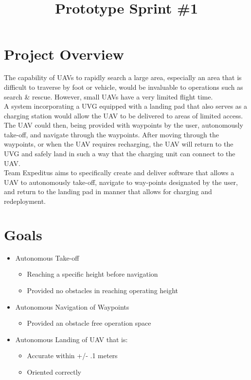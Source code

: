 \documentclass[11pt]{article}
\title{\textbf{Prototype Sprint \#1}}
\date{}
\begin{document}
\maketitle

\section*{Project Overview}

The capability of UAVs to rapidly search a large area, especially an area that is difficult to traverse by foot or vehicle, would be invaluable to operations such as search \& rescue. However, small UAVs have a very limited flight time.\\

\noindent A system incorporating a UVG equipped with a landing pad that also serves as a charging station would allow the UAV to be delivered to areas of limited access. The UAV could then, being provided with waypoints by the user, autonomously take-off, and navigate through the waypoints. After moving through the waypoints, or when the UAV requires recharging, the UAV will return to the UVG and safely land in such a way that the charging unit can connect to the UAV.\\

\noindent Team Expeditus aims to specifically create and deliver software that allows a UAV to autonomously take-off, navigate to way-points designated by the user, and return to the landing pad in manner that allows for charging and redeployment. 

\section*{Goals}
\begin{itemize}
\item Autonomous Take-off
\begin{itemize}
\item Reaching a specific height before navigation
\item Provided no obstacles in reaching operating height
\end{itemize}

\item Autonomous Navigation of Waypoints
\begin{itemize}
\item Provided an obstacle free operation space
\end{itemize}

\item Autonomous Landing of UAV that is:
\begin{itemize}
\item Accurate within +/- .1 meters
\item Oriented correctly
\end{itemize}
\end{itemize}
\end{document}

